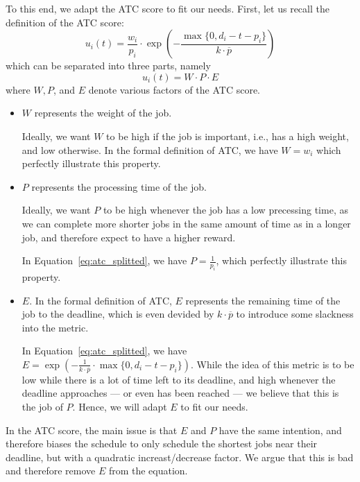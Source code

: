 To this end, we adapt the ATC score to fit our needs. First, let us recall the definition of the ATC score:
\begin{equation}
    u_i (t) = \frac{w_i}{p_i} \cdot \exp \left ( - \frac{\max \{0, d_i - t - p_i\}}{k \cdot \overline{p}} \right )
\end{equation}
which can be separated into three parts, namely 
\begin{equation}
    u_i (t) = W \cdot P \cdot E
    \label{eq:atc_splitted}
\end{equation}
where $W, P$, and $E$ denote various factors of the ATC score.
\begin{itemize}
    \item $W$ represents the weight of the job. 
    
        Ideally, we want $W$ to be high if the job is important, i.e., has a high weight, and low otherwise.
        In the formal definition of ATC, we have $W = w_i$ which perfectly illustrate this property.

    \item $P$ represents the processing time of the job.
    
        Ideally, we want $P$ to be high whenever the job has a low precessing time, as we can complete more shorter jobs in the same amount of time as in a longer job, and therefore expect to have a higher reward.

        In Equation~\ref{eq:atc_splitted}, we have $P = \frac{1}{p_i}$, which perfectly illustrate this property.

    \item $E$. In the formal definition of ATC, $E$ represents the remaining time of the job to the deadline, which is even devided by $k \cdot \overline{p}$ to introduce some slackness into the metric. 
    
    In Equation~\ref{eq:atc_splitted}, we have $E = \exp \left ( - \frac{1}{k \cdot \overline{p}} \cdot \max \{0, d_i - t - p_i\} \right )$. While the idea of this metric is to be low while there is a lot of time left to its deadline, and high whenever the deadline approaches --- or even has been reached --- we believe that this is the job of $P$. Hence, we will adapt $E$ to fit our needs.
\end{itemize}

In the ATC score, the main issue is that $E$ and $P$ have the same intention, and therefore biases the schedule to only schedule the shortest jobs near their deadline, but with a quadratic increast/decrease factor. 
We argue that this is bad and therefore remove $E$ from the equation.

